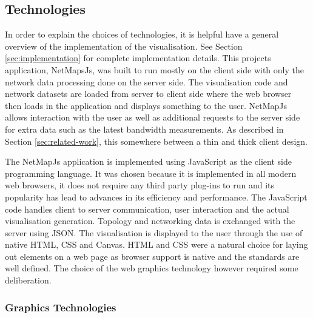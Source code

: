 \documentclass[11pt, a4paper]{article}
\begin{document}
\subsection{Technologies}
\label{sec:technologies}

In order to explain the choices of technologies, it is helpful have a general
overview of the implementation of the visualisation. See Section
\ref{sec:implementation} for complete implementation details. This projects
application, NetMapsJs, was built to run mostly on the client side with only the
network data processing done on the server side. The visualisation code and
network datasets are loaded from server to client side where the web browser
then loads in the application and displays something to the user. NetMapJs
allows interaction with the user as well as additional requests to the server
side for extra data such as the latest bandwidth measurements. As described in
Section \ref{sec:related-work}, this somewhere between a thin and thick client
design.

The NetMapJs application is implemented using JavaScript as the client side
programming language. It was chosen because it is implemented in all modern web
browsers, it does not require any third party plug-ins to run and its popularity
has lead to advances in its efficiency and performance. The JavaScript code
handles client to server communication, user interaction and the actual
visualisation generation. Topology and networking data is exchanged with the
server using JSON. The visualisation is displayed to the user through the use of
native HTML, CSS and Canvas. HTML and CSS were a natural choice for laying out
elements on a web page as browser support is native and the standards are well
defined. The choice of the web graphics technology however required some
deliberation. 


\subsubsection{Graphics Technologies}
\end{document}

